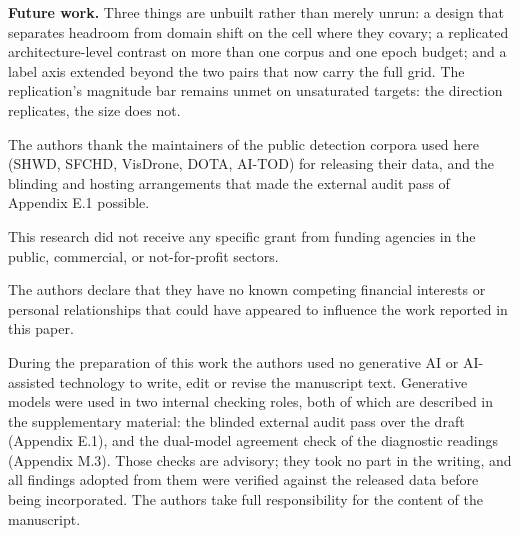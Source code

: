 \documentclass[pdflatex,sn-mathphys-ay]{sn-jnl}
\begin{document}
\textbf{Future work.} Three things are unbuilt rather than merely unrun: a design that separates headroom from domain shift on the cell where they covary; a replicated architecture-level contrast on more than one corpus and one epoch budget; and a label axis extended beyond the two pairs that now carry the full grid. The replication's magnitude bar remains unmet on unsaturated targets: the direction replicates, the size does not.

\backmatter


The authors thank the maintainers of the public detection corpora used here (SHWD, SFCHD, VisDrone, DOTA, AI-TOD) for releasing their data, and the blinding and hosting arrangements that made the external audit pass of Appendix E.1 possible.


This research did not receive any specific grant from funding agencies in the public, commercial, or not-for-profit sectors.


The authors declare that they have no known competing financial interests or personal relationships that could have appeared to influence the work reported in this paper.


During the preparation of this work the authors used no generative AI or AI-assisted technology to write, edit or revise the manuscript text. Generative models were used in two internal checking roles, both of which are described in the supplementary material: the blinded external audit pass over the draft (Appendix E.1), and the dual-model agreement check of the diagnostic readings (Appendix M.3). Those checks are advisory; they took no part in the writing, and all findings adopted from them were verified against the released data before being incorporated. The authors take full responsibility for the content of the manuscript.

\end{document}
